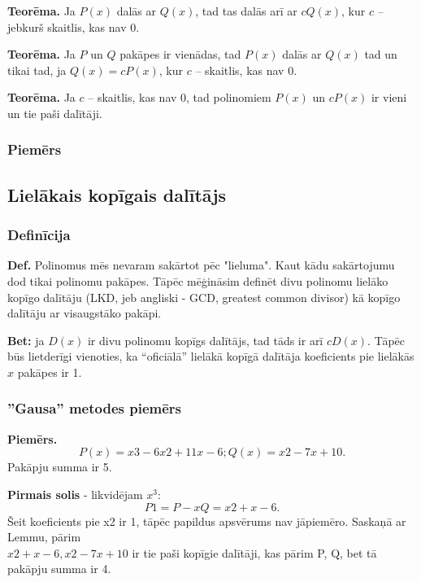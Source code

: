 \documentclass{article}
\begin{document}
\textbf{Teorēma.} Ja $P(x)$ dalās ar $Q(x)$, tad tas dalās arī ar $cQ(x)$, kur $c$ – jebkurš skaitlis, kas nav $0$.

\textbf{Teorēma.} Ja $P$ un $Q$ pakāpes ir vienādas, tad $P(x)$ dalās ar $Q(x)$ tad un tikai tad, ja $Q(x)=cP(x)$, kur $c$ – skaitlis, kas nav $0$.

\textbf{Teorēma.} Ja $c$ – skaitlis, kas nav $0$, tad polinomiem $P(x)$ un $cP(x)$ ir vieni un tie paši dalītāji.

\subsubsection{Piemērs}




\subsection{Lielākais kopīgais dalītājs}
\subsubsection{Definīcija}
\textbf{Def. }Polinomus mēs nevaram sakārtot pēc "lieluma". Kaut kādu sakārtojumu dod tikai polinomu pakāpes.  Tāpēc mēģināsim definēt divu polinomu lielāko kopīgo dalītāju (LKD, jeb angliski - GCD, greatest common divisor) kā kopīgo dalītāju ar visaugstāko pakāpi.

\textbf{Bet:} ja $D(x)$ ir divu polinomu kopīgs dalītājs, tad tāds ir arī $cD(x)$. Tāpēc būs lietderīgi vienoties, ka “oficiālā” lielākā kopīgā dalītāja koeficients pie lielākās $x$ pakāpes ir 1.

\subsubsection{''Gausa'' metodes piemērs}

\textbf{Piemērs.}
\begin{equation}
	P(x)=x3-6x2+11x-6; Q(x)=x2-7x+10.
\end{equation}
Pakāpju summa ir 5.

\textbf{Pirmais solis} - likvidējam $x^3$: 
\begin{equation}
	P1=P-xQ=x2+x-6.
\end{equation}
Šeit koeficients pie x2 ir 1, tāpēc papildus apsvērums nav jāpiemēro.  Saskaņā ar Lemmu, pārim \\ ${x2+x-6, x2-7x+10}$ ir tie paši kopīgie dalītāji, kas pārim {P, Q}, bet tā pakāpju summa ir 4.
\end{document}
